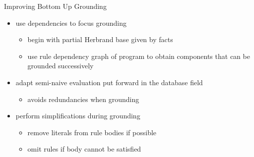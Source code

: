 \begin{frame}{Improving Bottom Up Grounding}
  \vfill
  \begin{itemize}
    \item use dependencies to \alert{focus} grounding
      \begin{itemize}
        \item begin with partial Herbrand base given by facts
        \item use rule dependency graph of program to obtain \alert{components} that can be \alert{grounded successively}
      \end{itemize}
    \item adapt \alert{semi-naive evaluation} put forward in the database field
      \begin{itemize}
        \item avoids redundancies when grounding
      \end{itemize}
    \item perform \alert{simplifications} during grounding
      \begin{itemize}
        \item remove literals from rule bodies if possible
        \item omit rules if body cannot be satisfied
      \end{itemize}
  \end{itemize}
\end{frame}

